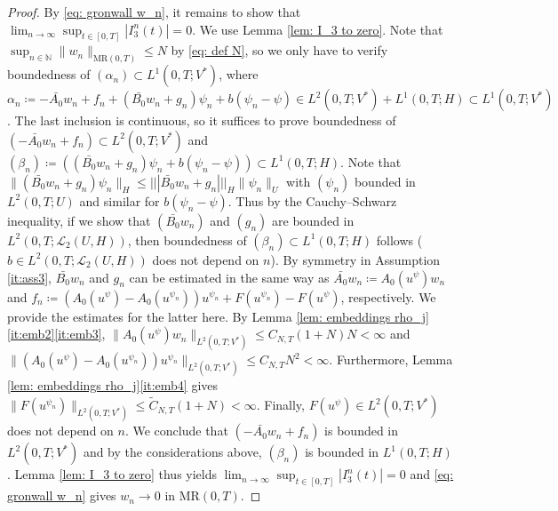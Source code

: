 \documentclass{amsart}
\renewcommand{\MR}{\mathrm{MR}}
\newcommand{\UH}{\mathcal{L}_2(U,H)}
\newcommand{\<}{\langle}
\newcommand{\?}{\rangle}
\newcommand{\nn}{|\!|\!|}
\theoremstyle{plain}
\theoremstyle{remark}
\theoremstyle{plain}
\numberwithin{equation}{section}
\def\N{{\mathbb N}}
\begin{document}
\begin{proof}
By \eqref{eq: gronwall w_n}, it remains to show that $\lim_{n\to\infty}\sup_{t\in[0,T]}|I_3^n(t)|=0$. We use Lemma \ref{lem: I_3 to zero}. Note that $\sup_{n\in\N}\|w_n\|_{\MR(0,T)}\leq N$ by \eqref{eq: def N}, so we only have to verify boundedness of $(\alpha_n)\subset L^1(0,T;V^*)$, where $\alpha_n\coloneqq -\bar{A_0}w_n+f_n+(\bar{B_0}w_n+g_n)\psi_n+{b}(\psi_n-\psi)\in L^2(0,T;V^*)+L^1(0,T;H)\subset L^1(0,T;V^*)$. The last inclusion is continuous, so it suffices to prove boundedness of $(-\bar{A_0}w_n+f_n)\subset L^2(0,T;V^*)$ and  $(\beta_n)\coloneqq((\bar{B_0}w_n+g_n)\psi_n+{b}(\psi_n-\psi))\subset L^1(0,T;H)$.
Note that $\|(\bar{B_0}w_n+g_n)\psi_n\|_H\leq \nn \bar{B_0}w_n+g_n\nn_H\|\psi_n\|_U$ with $(\psi_n)$ bounded in $L^2(0,T;U)$ and similar for ${b}(\psi_n-\psi)$. Thus by the Cauchy--Schwarz inequality, if we show that $(\bar{B_0}w_n)$ and $(g_n)$ are bounded in $L^2(0,T;\UH)$, then boundedness of $(\beta_n)\subset L^1(0,T;H)$ follows (${b}\in L^2(0,T;\UH)$ does not depend on $n$).
By symmetry in Assumption \ref{it:ass3}, $\bar{B_0}w_n$ and $g_n$ can be estimated in the same way as $\bar{A_0}w_n\coloneqq A_0(u^\psi)w_n$ and $f_n\coloneqq (A_0(u^\psi)-A_0(u^{\psi_n}))u^{\psi_n}+F(u^{\psi_n})-F(u^{\psi})$, respectively. We provide the estimates for the latter here.
By Lemma \ref{lem: embeddings rho_j}\ref{it:emb2}\ref{it:emb3}, $\|A_0(u^\psi)w_n\|_{L^2(0,T;V^*)}\leq C_{N,T}(1+N)N<\infty$ and  $\|(A_0(u^\psi)-A_0(u^{\psi_n}))u^{\psi_n}\|_{L^2(0,T;V^*)}\leq C_{N,T}N^2<\infty$.
Furthermore, Lemma \ref{lem: embeddings rho_j}\ref{it:emb4} gives
$\|F(u^{\psi_n})\|_{L^2(0,T;V^*)}\leq \tilde{C}_{N,T} (1+ N)<\infty$.
Finally, $F(u^{\psi})\in L^2(0,T;V^*)$ does not depend on $n$. We conclude that $(-\bar{A_0}w_n+f_n)$ is bounded in $L^2(0,T;V^*)$ and by the considerations above, $(\beta_n)$ is bounded in $L^1(0,T;H)$.
Lemma \ref{lem: I_3 to zero} thus yields $\lim_{n\to\infty}\sup_{t\in[0,T]}|I_3^n(t)|=0$ and \eqref{eq: gronwall w_n} gives $w_n\to 0$ in $\MR(0,T)$.
\end{proof}
\end{document}
